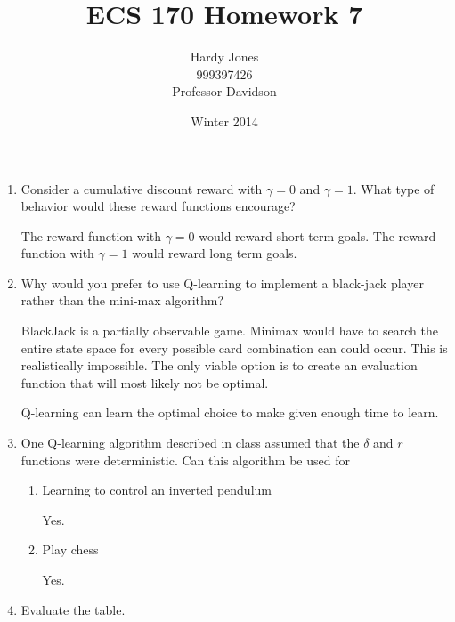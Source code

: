 \documentclass[12pt,letterpaper]{article}
\title{ECS 170 Homework 7\vspace{-2ex}}
\author{Hardy Jones\\
        999397426\\
        Professor Davidson\vspace{-2ex}}
\date{Winter 2014}
\begin{document}
  \maketitle

  \begin{enumerate}
    \item
      Consider a cumulative discount reward with $\gamma = 0$ and $\gamma = 1$.
      What type of behavior would these reward functions encourage?

      The reward function with $\gamma = 0$ would reward short term goals.
      The reward function with $\gamma = 1$ would reward long term goals.

    \item
      Why would you prefer to use Q-learning to implement a black-jack player rather than the mini-max algorithm?

      BlackJack is a partially observable game.
      Minimax would have to search the entire state space for every possible card combination can could occur.
      This is realistically impossible.
      The only viable option is to create an evaluation function that will most likely not be optimal.

      Q-learning can learn the optimal choice to make given enough time to learn.

    \item
      One Q-learning algorithm described in class assumed that the $\delta$ and $r$ functions were deterministic.
      Can this algorithm be used for
        \begin{enumerate}
          \item Learning to control an inverted pendulum

            Yes.
          \item Play chess

            Yes.
         \end{enumerate}

    \item
      Evaluate the table.


\end{enumerate}
\end{document}
